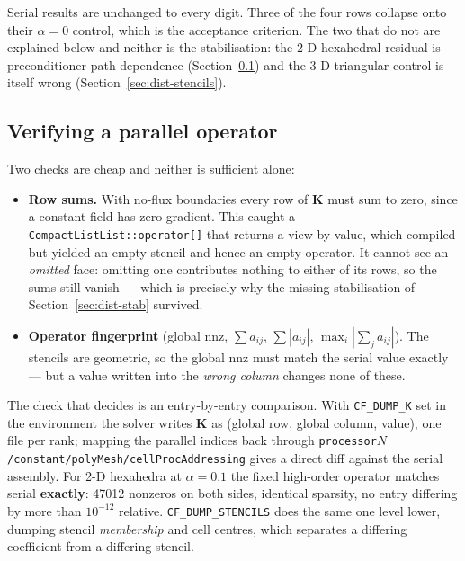 \documentclass[11pt,a4paper]{article}
\newcommand{\code}[1]{\texttt{\small #1}}
\newcommand{\Kstif}{\mathbf{K}}
\begin{document}
Serial results are unchanged to every digit. Three of the four rows collapse
onto their $\alpha=0$ control, which is the acceptance criterion. The two that
do not are explained below and neither is the stabilisation: the 2-D
hexahedral residual is preconditioner path dependence
(Section~\ref{sec:dist-verif}) and the 3-D triangular control is itself wrong
(Section~\ref{sec:dist-stencils}).

\subsection{Verifying a parallel operator}
\label{sec:dist-verif}

Two checks are cheap and neither is sufficient alone:

\begin{itemize}
  \item \textbf{Row sums.} With no-flux boundaries every row of $\Kstif$ must
        sum to zero, since a constant field has zero gradient. This caught a
        \code{CompactListList::operator[]} that returns a view by value, which
        compiled but yielded an empty stencil and hence an empty operator. It
        cannot see an \emph{omitted} face: omitting one contributes nothing to
        either of its rows, so the sums still vanish --- which is precisely why
        the missing stabilisation of Section~\ref{sec:dist-stab} survived.
  \item \textbf{Operator fingerprint} (global nnz, $\sum a_{ij}$,
        $\sum|a_{ij}|$, $\max_i|\sum_j a_{ij}|$). The stencils are geometric,
        so the global nnz must match the serial value exactly --- but a value
        written into the \emph{wrong column} changes none of these.
\end{itemize}

The check that decides is an entry-by-entry comparison. With \code{CF\_DUMP\_K}
set in the environment the solver writes $\Kstif$ as (global row, global
column, value), one file per rank; mapping the parallel indices back through
\code{processor$N$/constant/polyMesh/cellProcAddressing} gives a direct diff
against the serial assembly. For 2-D hexahedra at $\alpha=0.1$ the fixed
high-order operator matches serial \textbf{exactly}: 47012 nonzeros on both
sides, identical sparsity, no entry differing by more than $10^{-12}$
relative. \code{CF\_DUMP\_STENCILS} does the same one level lower, dumping
stencil \emph{membership} and cell centres, which separates a differing
coefficient from a differing stencil.
\end{document}
